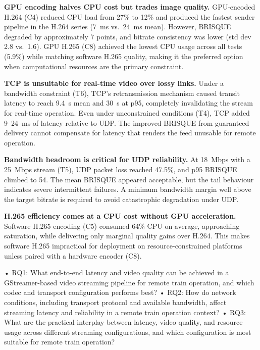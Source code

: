 \textbf{GPU encoding halves CPU cost but trades image quality.}
GPU-encoded H.264 (C4) reduced CPU load from 27\% to 12\% and produced the fastest sender pipeline in the H.264 series (7~ms vs.\ 24~ms mean). However, BRISQUE degraded by approximately 7 points, and bitrate consistency was lower (std dev 2.8 vs.\ 1.6). GPU H.265 (C8) achieved the lowest CPU usage across all tests (5.9\%) while matching software H.265 quality, making it the preferred option when computational resources are the primary constraint.

\textbf{TCP is unsuitable for real-time video over lossy links.}
Under a bandwidth constraint (T6), TCP's retransmission mechanism caused transit latency to reach 9.4~s mean and 30~s at p95, completely invalidating the stream for real-time operation. Even under unconstrained conditions (T4), TCP added 9--24~ms of latency relative to UDP. The improved BRISQUE from guaranteed delivery cannot compensate for latency that renders the feed unusable for remote operation.

\textbf{Bandwidth headroom is critical for UDP reliability.}
At 18~Mbps with a 25~Mbps stream (T5), UDP packet loss reached 47.5\%, and p95 BRISQUE climbed to 54. The mean BRISQUE appeared acceptable, but the tail behaviour indicates severe intermittent failures. A minimum bandwidth margin well above the target bitrate is required to avoid catastrophic degradation under UDP.

\textbf{H.265 efficiency comes at a CPU cost without GPU acceleration.}
Software H.265 encoding (C5) consumed 64\% CPU on average, approaching saturation, while delivering only marginal quality gains over H.264. This makes software H.265 impractical for deployment on resource-constrained platforms unless paired with a hardware encoder (C8).


• RQ1: What end-to-end latency and video quality can be achieved in a GStreamer-based video
streaming pipeline for remote train operation, and which codec and transport configuration
performs best?
• RQ2: How do network conditions, including transport protocol and available bandwidth,
affect streaming latency and reliability in a remote train operation context?
• RQ3: What are the practical interplay between latency, video quality, and resource usage
across different streaming configurations, and which configuration is most suitable for remote
train operation?



